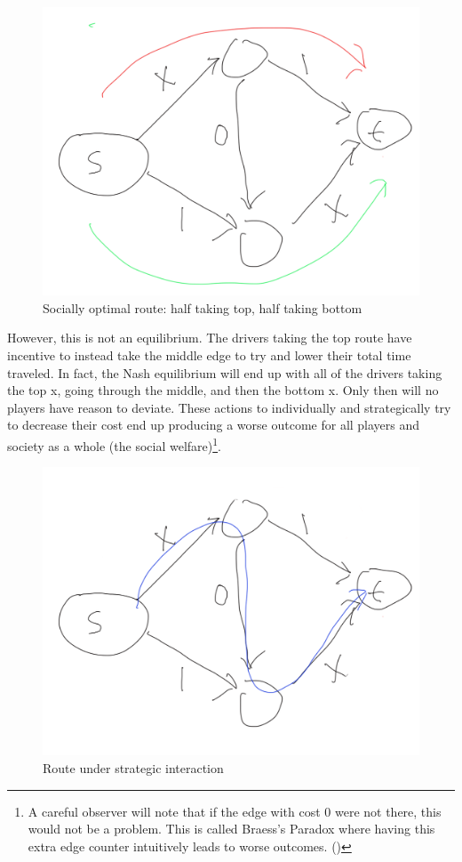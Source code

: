 \documentclass[12pt,twoside]{reedthesis}
\begin{document}
\begin{figure}[h!]
	\centering
	\includegraphics[scale=0.4]{braess_2}
	\caption{Socially optimal route: half taking top, half taking bottom}
	\label{braess2}
\end{figure}

However, this is not an equilibrium. The drivers taking the top route have incentive to instead take the middle edge to try and lower their total time traveled. In fact, the Nash equilibrium will end up with all of the drivers taking the top x, going through the middle, and then the bottom x. Only then will no players have reason to deviate. These actions to individually and strategically try to decrease their cost end up producing a worse outcome for all players and society as a whole (the social welfare)\footnote{A careful observer will note that if the edge with cost 0 were not there, this would not be a problem. This is called Braess's Paradox where having this extra edge counter intuitively leads to worse outcomes. (\cite{Roughgarden2016})}.  

\begin{figure}[h!]
	\centering
	\includegraphics[scale=0.4]{braess_3}
	\caption{Route under strategic interaction}
	\label{braess3}
\end{figure}
\end{document}
